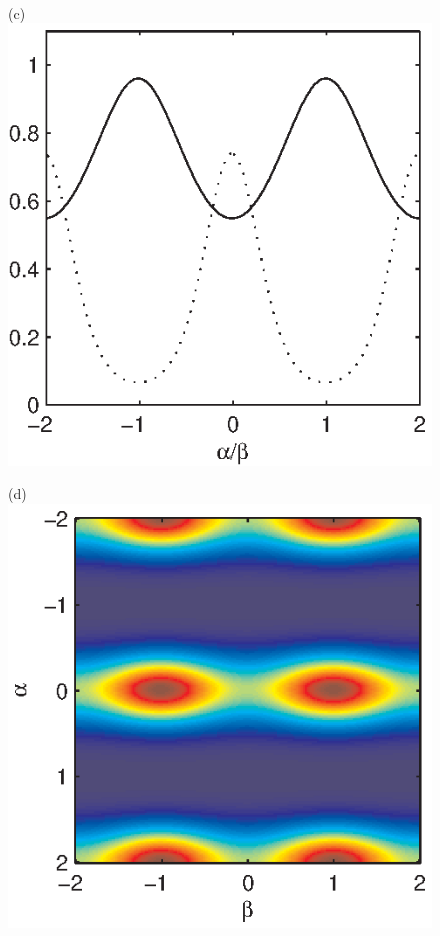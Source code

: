 \documentclass[dvips,aoas,preprint]{imsart}
\numberwithin{equation}{section}
\theoremstyle{plain}
\begin{document}
\begin{figure}[!htbp]
\begin{minipage}[]{0.35\textwidth}
    \end{minipage}\\
    \begin{minipage}[]{0.32\textwidth}
      \centering
      (c)
      \includegraphics*[width=\textwidth]{pdfen14b.eps}
    \end{minipage}
    \begin{minipage}[]{0.35\textwidth}
      \centering
      (d)
      \includegraphics*[width=\textwidth]{pdfen14.eps}

\end{minipage}
\end{figure}
\end{document}
